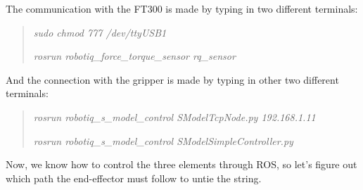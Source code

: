 The communication with the FT300 is made by typing in two different terminals:
\begin{quote}
\textit{sudo chmod 777 /dev/ttyUSB1}

\textit{rosrun robotiq\_force\_torque\_sensor rq\_sensor}
\end{quote}

And the connection with the gripper is made by typing in other two different terminals:
\begin{quote}
\textit{rosrun robotiq\_s\_model\_control SModelTcpNode.py 192.168.1.11}

\textit{rosrun robotiq\_s\_model\_control SModelSimpleController.py}
\end{quote}

Now, we know how to control the three elements through ROS, so let's figure out which path the end-effector must follow to untie the string.
